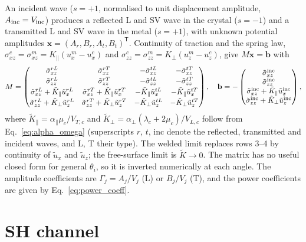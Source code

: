 An incident wave ($s=+1$, normalised to unit displacement amplitude, $A_{\rm inc}=V_{\rm inc}$)
produces a reflected L and SV wave in the crystal ($s=-1$) and a transmitted L and SV wave
in the metal ($s=+1$), with unknown potential amplitudes
$\mathbf x=(A_r,B_r,A_t,B_t)^{\mathsf T}$. Continuity of traction and the spring law,
$\sigma^c_{xz}=\sigma^m_{xz}=K_\parallel(u_x^m-u_x^c)$ and
$\sigma^c_{zz}=\sigma^m_{zz}=K_\perp(u_z^m-u_z^c)$, give $M\mathbf x=\mathbf b$ with
\begin{equation}
  M=\begin{pmatrix}
  \tilde\sigma_{xz}^{rL} & \tilde\sigma_{xz}^{rT} & -\tilde\sigma_{xz}^{tL} & -\tilde\sigma_{xz}^{tT}\\[2pt]
  \tilde\sigma_{zz}^{rL} & \tilde\sigma_{zz}^{rT} & -\tilde\sigma_{zz}^{tL} & -\tilde\sigma_{zz}^{tT}\\[2pt]
  \tilde\sigma_{xz}^{rL}+\tilde K_\parallel\tilde u_x^{rL} & \tilde\sigma_{xz}^{rT}+\tilde K_\parallel\tilde u_x^{rT} &
   -\tilde K_\parallel\tilde u_x^{tL} & -\tilde K_\parallel\tilde u_x^{tT}\\[2pt]
  \tilde\sigma_{zz}^{rL}+\tilde K_\perp\tilde u_z^{rL} & \tilde\sigma_{zz}^{rT}+\tilde K_\perp\tilde u_z^{rT} &
   -\tilde K_\perp\tilde u_z^{tL} & -\tilde K_\perp\tilde u_z^{tT}
  \end{pmatrix},\quad
  \mathbf b=-\begin{pmatrix}
  \tilde\sigma_{xz}^{\rm inc}\\ \tilde\sigma_{zz}^{\rm inc}\\
  \tilde\sigma_{xz}^{\rm inc}+\tilde K_\parallel\tilde u_x^{\rm inc}\\
  \tilde\sigma_{zz}^{\rm inc}+\tilde K_\perp\tilde u_z^{\rm inc}
  \end{pmatrix},
\end{equation}
where $\tilde K_\parallel=\alpha_\parallel\mu_c/V_{T,c}$ and
$\tilde K_\perp=\alpha_\perp(\lambda_c+2\mu_c)/V_{L,c}$ follow from Eq.~\eqref{eq:alpha_omega}
(superscripts $r$, $t$, inc denote the reflected, transmitted and incident waves, and L, T
their type). The welded limit replaces rows 3--4 by continuity of $\tilde u_x$ and $\tilde u_z$;
the free-surface limit is $\tilde K\to0$. The matrix has no useful closed form for general
$\theta_i$, so it is inverted numerically at each angle. The amplitude coefficients are
$\Gamma_j=A_j/V_j$ (L) or $B_j/V_j$ (T), and the power coefficients are given by
Eq.~\eqref{eq:power_coeff}.

\section{SH channel}

